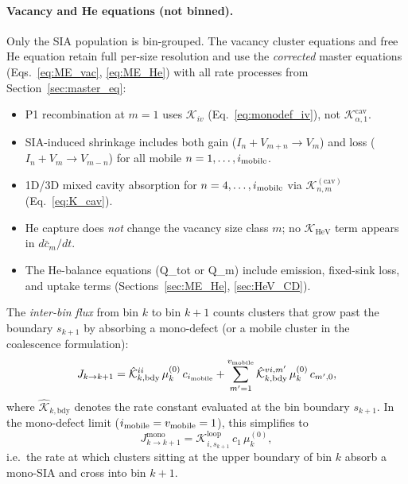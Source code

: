 \documentclass[pdflatex,sn-basic]{sn-jnl} %
\begin{document}
\paragraph{Vacancy and He equations (not binned).}
Only the SIA population is bin-grouped. The vacancy cluster equations
and free He equation retain full per-size resolution and use the
\emph{corrected} master equations (Eqs.~\ref{eq:ME_vac},
\ref{eq:ME_He}) with all rate processes from Section~\ref{sec:master_eq}:
\begin{itemize}
    \item P1 recombination at $m=1$ uses $\mathcal{K}_{iv}$
    (Eq.~\ref{eq:monodef_iv}), not $\mathcal{K}_{\alpha,1}^{\mathrm{cav}}$.
    \item SIA-induced shrinkage includes both gain ($I_n + V_{m+n} \to V_m$)
    and loss ($I_n + V_m \to V_{m-n}$) for all mobile $n = 1,\ldots,i_{\rm mobile}$.
    \item 1D/3D mixed cavity absorption for $n = 4,\ldots,i_{\rm mobile}$
    via $\mathcal{K}_{n,m}^{(\mathrm{cav})}$ (Eq.~\ref{eq:K_cav}).
    \item He capture does \emph{not} change the vacancy size class $m$;
    no $\mathcal{K}_{\mathrm{HeV}}$ term appears in $d\bar{c}_m/dt$.
    \item The He-balance equations (Q\_tot or Q\_m) include emission,
    fixed-sink loss, and uptake terms (Sections~\ref{sec:ME_He},
    \ref{sec:HeV_CD}).
\end{itemize}
The \emph{inter-bin flux} from bin $k$ to bin $k+1$ counts clusters
that grow past the boundary $s_{k+1}$ by absorbing a mono-defect
(or a mobile cluster in the coalescence formulation):
\begin{equation}\label{eq:inter_bin_flux}
    J_{k \to k+1}
    = \hat{\mathcal{K}}_{k,\mathrm{bdy}}^{ii}\,
      \mu_k^{(0)}\,c_{i_{\rm mobile}}
    + \sum_{m'=1}^{v_{\rm mobile}}
      \hat{\mathcal{K}}_{k,\mathrm{bdy}}^{vi,m'}\,
      \mu_k^{(0)}\,c_{m',0},
\end{equation}
where $\hat{\mathcal{K}}_{k,\mathrm{bdy}}$ denotes the rate constant
evaluated at the bin boundary $s_{k+1}$. In the mono-defect limit
($i_{\rm mobile} = v_{\rm mobile} = 1$), this simplifies to
\begin{equation}\label{eq:Jkk1_monodefect}
    J_{k \to k+1}^{\mathrm{mono}}
    = \mathcal{K}_{i,s_{k+1}}^{\mathrm{loop}}\,c_1\,\mu_k^{(0)},
\end{equation}
i.e.\ the rate at which clusters sitting at the upper boundary of bin
$k$ absorb a mono-SIA and cross into bin $k+1$.
\end{document}
